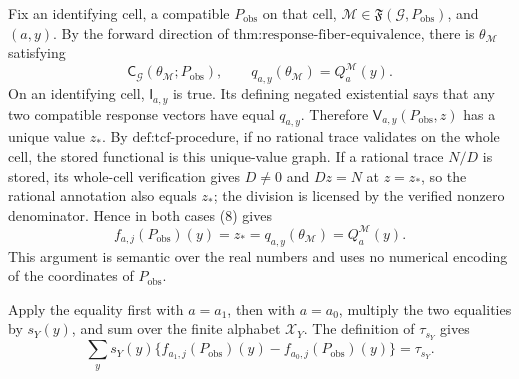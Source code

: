 Fix an identifying cell, a compatible \(P_{\mathrm{obs}}\) on that cell, \(\mathcal M\in\mathfrak F(\mathcal G,P_{\mathrm{obs}})\), and \((a,y)\). By the forward direction of \(\text{thm:response-fiber-equivalence}\), there is \(\theta_{\mathcal M}\) satisfying
\[
\mathsf C_{\mathcal G}(\theta_{\mathcal M};P_{\mathrm{obs}}),
\qquad
q_{a,y}(\theta_{\mathcal M})=Q_a^{\mathcal M}(y).
\tag{8}
\]
On an identifying cell, \(\mathsf I_{a,y}\) is true. Its defining negated existential says that any two compatible response vectors have equal \(q_{a,y}\). Therefore \(\mathsf V_{a,y}(P_{\mathrm{obs}},z)\) has a unique value \(z_*\). By \(\text{def:tcf-procedure}\), if no rational trace validates on the whole cell, the stored functional is this unique-value graph. If a rational trace \(N/D\) is stored, its whole-cell verification gives \(D\neq0\) and \(Dz=N\) at \(z=z_*\), so the rational annotation also equals \(z_*\); the division is licensed by the verified nonzero denominator. Hence in both cases (8) gives
\[
f_{a,j}(P_{\mathrm{obs}})(y)=z_*=q_{a,y}(\theta_{\mathcal M})=Q_a^{\mathcal M}(y).
\]
This argument is semantic over the real numbers and uses no numerical encoding of the coordinates of \(P_{\mathrm{obs}}\).

Apply the equality first with \(a=a_1\), then with \(a=a_0\), multiply the two equalities by \(s_Y(y)\), and sum over the finite alphabet \(\mathcal X_Y\). The definition of \(\tau_{s_Y}\) gives
\[
\sum_y s_Y(y)\{f_{a_1,j}(P_{\mathrm{obs}})(y)-f_{a_0,j}(P_{\mathrm{obs}})(y)\}
=\tau_{s_Y}.
\]